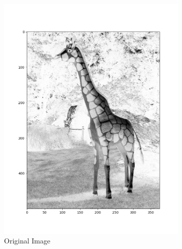\documentclass[12pt, oneside]{article}
\begin{document}
\begin{figure}[H]
    \centering
    \begin{subfigure}[b]{0.3\textwidth}
        \centering
        \includegraphics[width=\textwidth]{imgs/q1_original.png}
        \caption{Original Image}
        \label{fig:y equals x}
    \end{subfigure}
    \hfill
    \begin{subfigure}[b]{0.3\textwidth}
        \centering

\end{subfigure}
\end{figure}
\end{document}
